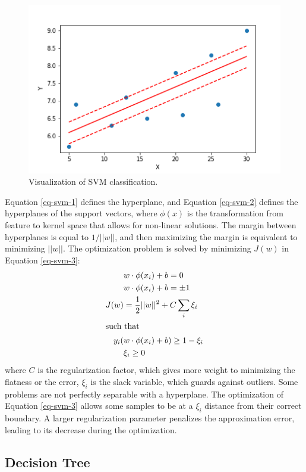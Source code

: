 \begin{figure}[htbp!] %
  \centering
  \includegraphics[width=0.5\linewidth]{figures/svr}
  \caption{Visualization of SVM classification.}
  \label{fig:svm}
\end{figure}

Equation \ref{eq-svm-1} defines the hyperplane, and Equation \ref{eq-svm-2} defines the hyperplanes of the support vectors, where $\phi(x)$ is the transformation from feature to kernel space that allows for non-linear solutions.
The margin between hyperplanes is equal to $1/||w||$, and then maximizing the margin is equivalent to minimizing $||w||$.
The optimization problem is solved by minimizing $J(w)$ in Equation \ref{eq-svm-3}:
\begin{align}
&w \cdot \phi(x_i) + b = 0    \label{eq-svm-1} \\
&w \cdot \phi(x_i) + b = \pm1 \label{eq-svm-2} \\
J(w) &= \frac{1}{2} ||w||^2 + C \sum_i \xi_i \label{eq-svm-3} \\
\intertext{such that}
y_i(&w \cdot \phi(x_i) + b) \geq 1-\xi_i \\
& \xi_i \geq 0
\end{align}
where $C$ is the regularization factor, which gives more weight to minimizing the flatness or the error, $\xi_i$ is the slack variable, which guards against outliers.
Some problems are not perfectly separable with a hyperplane.
The optimization of Equation \ref{eq-svm-3} allows some samples to be at a $\xi_i$ distance from their correct boundary.
A larger regularization parameter penalizes the approximation error, leading to its decrease during the optimization.


\subsection{Decision Tree}

